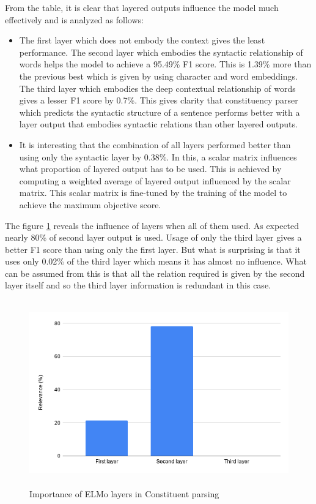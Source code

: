 \documentclass[a4paper, 11pt]{article}
\begin{document}
From the table, it is clear that layered outputs influence the model much effectively and is analyzed as follows:
\begin{itemize}
\item The first layer which does not embody the context gives the least performance. The second layer which embodies the syntactic relationship of words helps the model to achieve a 95.49\% F1 score. This is 1.39\% more than the previous best which is given by using character and word embeddings. The third layer which embodies the deep contextual relationship of words gives a lesser F1 score by 0.7\%. This gives clarity that constituency parser which predicts the syntactic structure of a sentence performs better with a layer output that embodies syntactic relations than other layered outputs. 
\item It is interesting that the combination of all layers performed better than using only the syntactic layer by 0.38\%. In this, a scalar matrix influences what proportion of layered output has to be used. This is achieved by computing a weighted average of layered output influenced by the scalar matrix. This scalar matrix is fine-tuned by the training of the model to achieve the maximum objective score. 
\end{itemize}

The figure \ref{fig:elmo-layers-relevance} reveals the influence of layers when all of them used. As expected nearly 80\% of second layer output is used. Usage of only the third layer gives a better F1 score than using only the first layer. But what is surprising is that it uses only 0.02\% of the third layer which means it has almost no influence. What can be assumed from this is that all the relation required is given by the second layer itself and so the third layer information is redundant in this case. 

\begin{figure}[H]
    \centering
    \includegraphics[width=\textwidth,height=8cm,keepaspectratio=true]
    {elmo-layers-relevance.png}
    \caption{
        Importance of ELMo layers in Constituent parsing
    }
    \label{fig:elmo-layers-relevance}
\end{figure}
\end{document}
